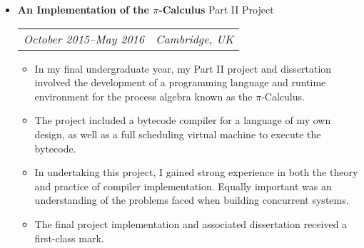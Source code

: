 \documentclass[letterpaper]{article}
\begin{document}
\begin{itemize}

    \item \textbf{An Implementation of the $\pi$-Calculus} Part II Project \\
        \begin{tabular}{c|c}
            \emph{October 2015--May 2016} & \emph{Cambridge, UK}
        \end{tabular}
        \begin{itemize}
            \item In my final undergraduate year, my Part II project and
                dissertation involved the development of a programming language
                and runtime environment for the process algebra known as the
                $\pi$-Calculus.

            \item The project included a bytecode compiler for a language of my
                own design, as well as a full scheduling virtual machine to
                execute the bytecode.

            \item In undertaking this project, I gained strong experience in
                both the theory and practice of compiler implementation. Equally
                important was an understanding of the problems faced when
                building concurrent systems.

            \item The final project implementation and associated dissertation
                received a first-class mark.
        \end{itemize}


\end{itemize}
\end{document}
